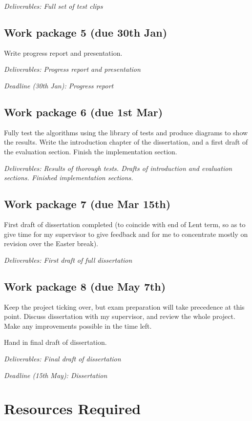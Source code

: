 \documentclass[12pt]{article}
\begin{document}
\emph{Deliverables: Full set of test clips}

\subsection*{Work package 5 (due 30th Jan)}
Write progress report and presentation.

\emph{Deliverables: Progress report and presentation}

\emph{Deadline (30th Jan): Progress report}

\subsection*{Work package 6 (due 1st Mar)}
Fully test the algorithms using the library of tests and produce diagrams to show the results. Write the introduction chapter of the dissertation, and a first draft of the evaluation section. Finish the implementation section.

\emph{Deliverables: Results of thorough tests. Drafts of introduction and evaluation sections. Finished implementation sections.}

\subsection*{Work package 7 (due Mar 15th)}
First draft of dissertation completed (to coincide with end of Lent term, so as to give time for my supervisor to give feedback and for me to concentrate mostly on revision over the Easter break).

\emph{Deliverables: First draft of full dissertation}

\subsection*{Work package 8 (due May 7th)}
Keep the project ticking over, but exam preparation will take precedence at this point. Discuss dissertation with my supervisor, and review the whole project. Make any improvements possible in the time left.

Hand in final draft of dissertation. 

\emph{Deliverables: Final draft of dissertation}

\emph{Deadline (15th May): Dissertation}


\section*{Resources Required}
\end{document}
